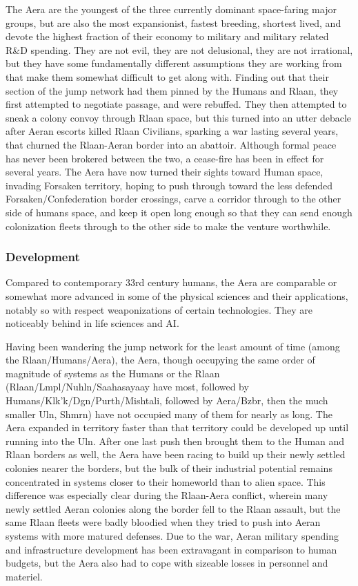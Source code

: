 The Aera are the youngest of the three currently dominant space-faring
major groups, but are also the most expansionist, fastest breeding,
shortest lived, and devote the highest fraction of their economy to
military and military related R\&D spending. They are not evil, they
are not delusional, they are not irrational, but they have some
fundamentally different assumptions they are working from that make
them somewhat difficult to get along with. Finding out that their
section of the jump network had them pinned by the Humans and Rlaan,
they first attempted to negotiate passage, and were rebuffed. They
then attempted to sneak a colony convoy through Rlaan space, but this
turned into an utter debacle after Aeran escorts killed Rlaan
Civilians, sparking a war lasting several years, that churned the
Rlaan-Aeran border into an abattoir. Although formal peace has never
been brokered between the two, a cease-fire has been in effect for
several years. The Aera have now turned their sights toward Human
space, invading Forsaken territory, hoping to push through toward the
less defended Forsaken/Confederation border crossings, carve a
corridor through to the other side of humans space, and keep it open
long enough so that they can send enough colonization fleets through
to the other side to make the venture worthwhile.

\subsubsection{Development}
Compared to contemporary 33rd century humans, the Aera are comparable
or somewhat more advanced in some of the physical sciences and their
applications, notably so with respect weaponizations of certain
technologies. They are noticeably behind in life sciences and AI.

Having been wandering the jump network for the least amount of time
(among the Rlaan/Humans/Aera), the Aera, though occupying the same
order of magnitude of systems as the Humans or the Rlaan
(Rlaan/Lmpl/Nuhln/Saahasayaay have most, followed by
Humans/Klk'k/Dgn/Purth/Mishtali, followed by Aera/Bzbr, then the much
smaller Uln, Shmrn) have not occupied many of them for nearly as
long. The Aera expanded in territory faster than that territory could
be developed up until running into the Uln. After one last push then
brought them to the Human and Rlaan borders as well, the Aera have
been racing to build up their newly settled colonies nearer the
borders, but the bulk of their industrial potential remains
concentrated in systems closer to their homeworld than to alien
space. This difference was especially clear during the Rlaan-Aera
conflict, wherein many newly settled Aeran colonies along the border
fell to the Rlaan assault, but the same Rlaan fleets were badly
bloodied when they tried to push into Aeran systems with more matured
defenses. Due to the war, Aeran military spending and infrastructure
development has been extravagant in comparison to human budgets, but
the Aera also had to cope with sizeable losses in personnel and
materiel.

